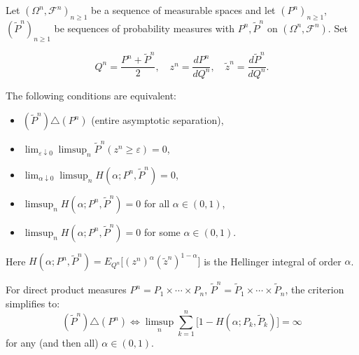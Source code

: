 Let $(\Omega^n, \mathcal{F}^n)_{n \geq 1}$ be a sequence of measurable spaces and let $(P^n)_{n \geq 1}$, $(\tilde{P}^n)_{n \geq 1}$ be sequences of probability measures with $P^n, \tilde{P}^n$ on $(\Omega^n, \mathcal{F}^n)$. Set

$$Q^n = \frac{P^n + \tilde{P}^n}{2}, \quad z^n = \frac{dP^n}{dQ^n}, \quad \tilde{z}^n = \frac{d\tilde{P}^n}{dQ^n}.$$

The following conditions are equivalent:

\begin{itemize}
\item[(a)] $(\tilde{P}^n) \triangle (P^n)$ (entire asymptotic separation),
\item[(b)] $\displaystyle \lim_{\varepsilon \downarrow 0} \limsup_n \tilde{P}^n(z^n \geq \varepsilon) = 0$,
\item[(c)] $\displaystyle \lim_{\alpha \downarrow 0} \limsup_n H(\alpha; P^n, \tilde{P}^n) = 0$,
\item[(d)] $\displaystyle \limsup_n H(\alpha; P^n, \tilde{P}^n) = 0$ for all $\alpha \in (0, 1)$,
\item[(e)] $\displaystyle \limsup_n H(\alpha; P^n, \tilde{P}^n) = 0$ for some $\alpha \in (0, 1)$.
\end{itemize}

Here $H(\alpha; P^n, \tilde{P}^n) = E_{Q^n}\big[(z^n)^\alpha (\tilde{z}^n)^{1-\alpha}\big]$ is the Hellinger integral of order $\alpha$.

For direct product measures $P^n = P_1 \times \cdots \times P_n$, $\tilde{P}^n = \tilde{P}_1 \times \cdots \times \tilde{P}_n$, the criterion simplifies to:
$$(\tilde{P}^n) \triangle (P^n) \iff \limsup_n \sum_{k=1}^n \big[1 - H(\alpha; P_k, \tilde{P}_k)\big] = \infty$$
for any (and then all) $\alpha \in (0, 1)$.
